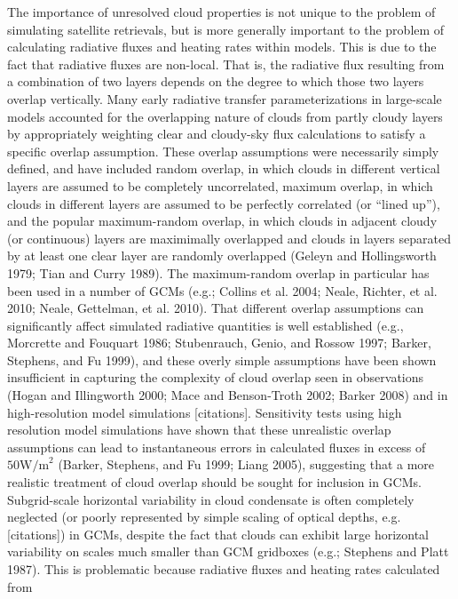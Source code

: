 The importance of unresolved cloud properties is not unique to the
problem of simulating satellite retrievals, but is more generally
important to the problem of calculating radiative fluxes and heating
rates within models. This is due to the fact that radiative fluxes are
non-local. That is, the radiative flux resulting from a combination of
two layers depends on the degree to which those two layers overlap
vertically. Many early radiative transfer parameterizations in
large-scale models accounted for the overlapping nature of clouds from
partly cloudy layers by appropriately weighting clear and cloudy-sky
flux calculations to satisfy a specific overlap assumption. These
overlap assumptions were necessarily simply defined, and have included
random overlap, in which clouds in different vertical layers are assumed
to be completely uncorrelated, maximum overlap, in which clouds in
different layers are assumed to be perfectly correlated (or ``lined
up''), and the popular maximum-random overlap, in which clouds in
adjacent cloudy (or continuous) layers are maximimally overlapped and
clouds in layers separated by at least one clear layer are randomly
overlapped (Geleyn and Hollingsworth 1979; Tian and Curry 1989). The
maximum-random overlap in particular has been used in a number of GCMs
(e.g.; Collins et al. 2004; Neale, Richter, et al. 2010; Neale,
Gettelman, et al. 2010). That different overlap assumptions can
significantly affect simulated radiative quantities is well established
(e.g., Morcrette and Fouquart 1986; Stubenrauch, Genio, and Rossow 1997;
Barker, Stephens, and Fu 1999), and these overly simple assumptions have
been shown insufficient in capturing the complexity of cloud overlap
seen in observations (Hogan and Illingworth 2000; Mace and Benson-Troth
2002; Barker 2008) and in high-resolution model simulations
{[}citations{]}. Sensitivity tests using high resolution model
simulations have shown that these unrealistic overlap assumptions can
lead to instantaneous errors in calculated fluxes in excess of
\(50 \textrm{W/m}^2\) (Barker, Stephens, and Fu 1999; Liang 2005),
suggesting that a more realistic treatment of cloud overlap should be
sought for inclusion in GCMs. Subgrid-scale horizontal variability in
cloud condensate is often completely neglected (or poorly represented by
simple scaling of optical depths, e.g. {[}citations{]}) in GCMs, despite
the fact that clouds can exhibit large horizontal variability on scales
much smaller than GCM gridboxes (e.g.; Stephens and Platt 1987). This is
problematic because radiative fluxes and heating rates calculated from

